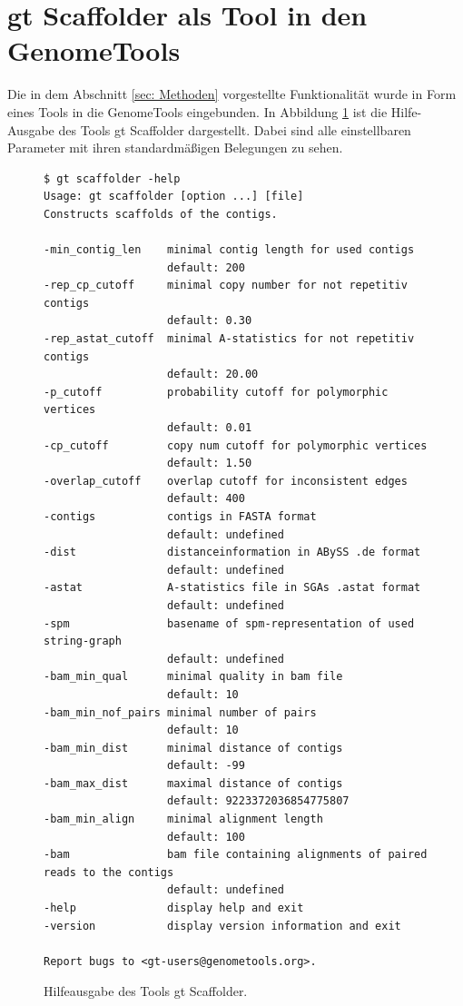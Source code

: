 \documentclass[a4paper,10pt,parskip]{scrartcl}
\begin{document}
\section{gt Scaffolder als Tool in den GenomeTools}
Die in dem Abschnitt \ref{sec: Methoden} vorgestellte Funktionalität
wurde in Form eines Tools in die GenomeTools eingebunden. In Abbildung
\ref{abb: help} ist die Hilfe-Ausgabe des Tools gt Scaffolder
dargestellt. Dabei sind alle einstellbaren Parameter mit ihren
standardmäßigen Belegungen zu sehen.

\begin{figure}
\begin{verbatim}
$ gt scaffolder -help
Usage: gt scaffolder [option ...] [file]
Constructs scaffolds of the contigs.

-min_contig_len    minimal contig length for used contigs
                   default: 200
-rep_cp_cutoff     minimal copy number for not repetitiv contigs
                   default: 0.30
-rep_astat_cutoff  minimal A-statistics for not repetitiv contigs
                   default: 20.00
-p_cutoff          probability cutoff for polymorphic vertices
                   default: 0.01
-cp_cutoff         copy num cutoff for polymorphic vertices
                   default: 1.50
-overlap_cutoff    overlap cutoff for inconsistent edges
                   default: 400
-contigs           contigs in FASTA format
                   default: undefined
-dist              distanceinformation in ABySS .de format
                   default: undefined
-astat             A-statistics file in SGAs .astat format
                   default: undefined
-spm               basename of spm-representation of used string-graph
                   default: undefined
-bam_min_qual      minimal quality in bam file
                   default: 10
-bam_min_nof_pairs minimal number of pairs
                   default: 10
-bam_min_dist      minimal distance of contigs
                   default: -99
-bam_max_dist      maximal distance of contigs
                   default: 9223372036854775807
-bam_min_align     minimal alignment length
                   default: 100
-bam               bam file containing alignments of paired reads to the contigs
                   default: undefined
-help              display help and exit
-version           display version information and exit

Report bugs to <gt-users@genometools.org>.
\end{verbatim}
\caption{\label{abb: help}Hilfeausgabe des Tools gt Scaffolder.}
\end{figure}
\end{document}

